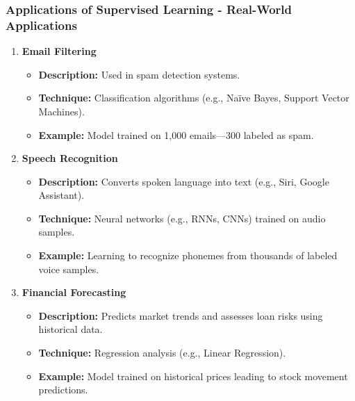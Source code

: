 \documentclass[aspectratio=169]{beamer}
\begin{document}
\begin{frame}[fragile]
    \frametitle{Applications of Supervised Learning - Real-World Applications}
    \begin{enumerate}
        \item \textbf{Email Filtering}
            \begin{itemize}
                \item \textbf{Description:} Used in spam detection systems.
                \item \textbf{Technique:} Classification algorithms (e.g., Naïve Bayes, Support Vector Machines).
                \item \textbf{Example:} Model trained on 1,000 emails—300 labeled as spam.
            \end{itemize}
        \item \textbf{Speech Recognition}
            \begin{itemize}
                \item \textbf{Description:} Converts spoken language into text (e.g., Siri, Google Assistant).
                \item \textbf{Technique:} Neural networks (e.g., RNNs, CNNs) trained on audio samples.
                \item \textbf{Example:} Learning to recognize phonemes from thousands of labeled voice samples.
            \end{itemize}
        \item \textbf{Financial Forecasting}
            \begin{itemize}
                \item \textbf{Description:} Predicts market trends and assesses loan risks using historical data.
                \item \textbf{Technique:} Regression analysis (e.g., Linear Regression).
                \item \textbf{Example:} Model trained on historical prices leading to stock movement predictions.
            \end{itemize}
    \end{enumerate}
\end{frame}
\end{document}
